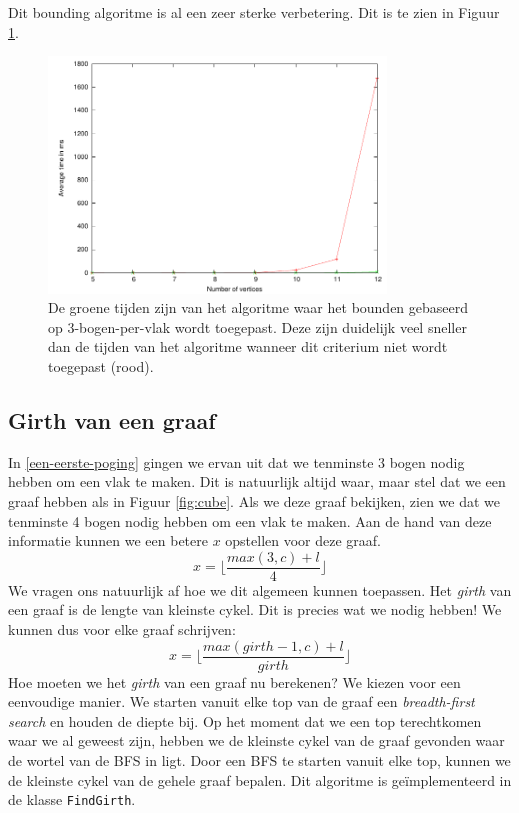 \documentclass{article}
\begin{document}
Dit bounding algoritme is al een zeer sterke verbetering. Dit is te zien in
Figuur \ref{fig:processed-vs-bounded}.

\begin{figure}
\begin{center}
\includegraphics[width=0.8\textwidth]{images/processed-vs-bounded.pdf}
\caption{De groene tijden zijn van het algoritme waar het bounden gebaseerd op
3-bogen-per-vlak wordt toegepast. Deze zijn duidelijk veel sneller dan de tijden
van het algoritme wanneer dit criterium niet wordt toegepast (rood).}
\label{fig:processed-vs-bounded}
\end{center}
\end{figure}

\subsection{Girth van een graaf}
\label{girth-bounding}
In \ref{een-eerste-poging} gingen we ervan uit dat we tenminste 3 bogen nodig
hebben om een vlak te maken. Dit is natuurlijk altijd waar, maar stel dat we
een graaf hebben als in Figuur \ref{fig:cube}. Als we deze graaf bekijken, zien
we dat we tenminste 4 bogen nodig hebben om een vlak te maken. Aan de hand van
deze informatie kunnen we een betere $x$ opstellen voor deze graaf.
\begin{equation*}
x = \lfloor\frac{max(3, c) + l}{4}\rfloor
\end{equation*}
We vragen ons natuurlijk af hoe we dit algemeen kunnen toepassen. Het
\emph{girth} van een graaf is de lengte van kleinste cykel. Dit is precies wat
we nodig hebben! We kunnen dus voor elke graaf schrijven:
\begin{equation*}
x = \lfloor\frac{max(girth - 1, c) + l}{girth}\rfloor
\end{equation*}
Hoe moeten we het \emph{girth} van een graaf nu berekenen? We kiezen voor een
eenvoudige manier. We starten vanuit elke top van de graaf een
\emph{breadth-first search} en houden de diepte bij. Op het moment dat we een
top terechtkomen waar we al geweest zijn, hebben we de kleinste cykel van de
graaf gevonden waar de wortel van de BFS in ligt. Door een BFS te starten vanuit
elke top, kunnen we de kleinste cykel van de gehele graaf bepalen.  Dit
algoritme is ge\"implementeerd in de klasse \verb#FindGirth#.
\newline
\end{document}
